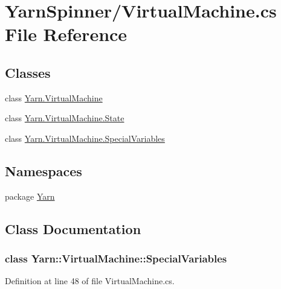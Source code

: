 \hypertarget{a00304}{\section{Yarn\-Spinner/\-Virtual\-Machine.cs File Reference}
\label{a00304}
}
\subsection*{Classes}
\begin{DoxyCompactItemize}
\item 
class \hyperlink{a00156}{Yarn.\-Virtual\-Machine}
\item 
class \hyperlink{a00159}{Yarn.\-Virtual\-Machine.\-State}
\item 
class \hyperlink{a00156_a00369}{Yarn.\-Virtual\-Machine.\-Special\-Variables}
\end{DoxyCompactItemize}
\subsection*{Namespaces}
\begin{DoxyCompactItemize}
\item 
package \hyperlink{a00045}{Yarn}
\end{DoxyCompactItemize}


\subsection{Class Documentation}
\label{a00369}
\hypertarget{a00156_a00369}{}
\subsubsection{class Yarn\-:\-:Virtual\-Machine\-:\-:Special\-Variables}


Definition at line 48 of file Virtual\-Machine.\-cs.



